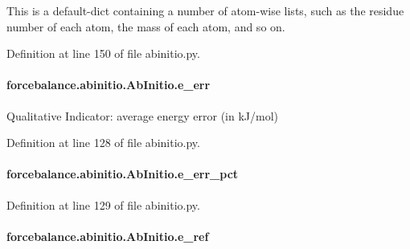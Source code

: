 This is a default-\/dict containing a number of atom-\/wise lists, such as the residue number of each atom, the mass of each atom, and so on. 



Definition at line 150 of file abinitio.\-py.

\hypertarget{classforcebalance_1_1abinitio_1_1AbInitio_aa569290969858e189935b3de37ead3f0}{
\paragraph[{e\-\_\-err}]{\setlength{\rightskip}{0pt plus 5cm}forcebalance.\-abinitio.\-Ab\-Initio.\-e\-\_\-err\hspace{0.3cm}{\ttfamily [inherited]}}}\label{classforcebalance_1_1abinitio_1_1AbInitio_aa569290969858e189935b3de37ead3f0}


Qualitative Indicator\-: average energy error (in k\-J/mol) 



Definition at line 128 of file abinitio.\-py.

\hypertarget{classforcebalance_1_1abinitio_1_1AbInitio_a4e3e525a03ab55bc004ebf0e3a0d60ce}{
\paragraph[{e\-\_\-err\-\_\-pct}]{\setlength{\rightskip}{0pt plus 5cm}forcebalance.\-abinitio.\-Ab\-Initio.\-e\-\_\-err\-\_\-pct\hspace{0.3cm}{\ttfamily [inherited]}}}\label{classforcebalance_1_1abinitio_1_1AbInitio_a4e3e525a03ab55bc004ebf0e3a0d60ce}


Definition at line 129 of file abinitio.\-py.

\hypertarget{classforcebalance_1_1abinitio_1_1AbInitio_a71d13d3fabd98146c68bb5fc784f6732}{
\paragraph[{e\-\_\-ref}]{\setlength{\rightskip}{0pt plus 5cm}forcebalance.\-abinitio.\-Ab\-Initio.\-e\-\_\-ref\hspace{0.3cm}{\ttfamily [inherited]}}}\label{classforcebalance_1_1abinitio_1_1AbInitio_a71d13d3fabd98146c68bb5fc784f6732}



